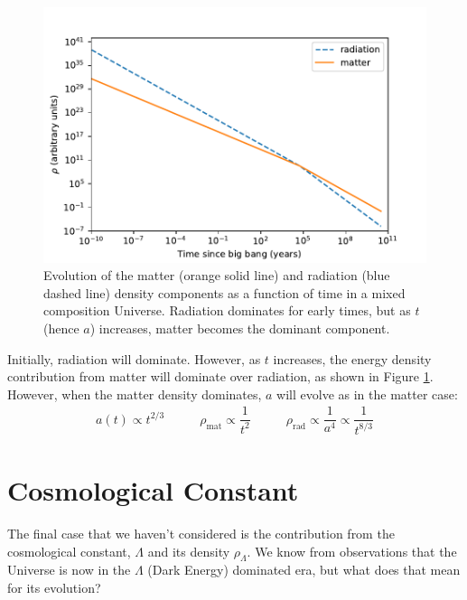 \documentclass[11pt,a4paper]{book}
\begin{document}
\begin{figure}
\includegraphics[width=1\linewidth]{Images/density_plot} \caption{Evolution of the matter (orange solid line) and radiation (blue dashed line) density components as a function of time in a mixed composition Universe. Radiation dominates for early times, but as $t$ (hence $a$) increases, matter becomes the dominant component.}\label{fig:density-fig}
\end{figure}

Initially, radiation will dominate. However, as \(t\) increases, the
energy density contribution from matter will dominate over radiation, as
shown in
Figure \ref{fig:density-fig}. However, when the matter density
dominates, \(a\) will evolve as in the matter case:
\begin{equation}
\begin{array}{lcr}
    a(t) \propto t^{2/3} & \qquad
    \rho_{\text{mat}} \propto \dfrac{1}{t^2} & \qquad
    \rho_{\text{rad}} \propto \dfrac{1}{a^4} \propto \dfrac{1}{t^{8/3}}
\end{array}
\label{eq:a-rho-comb}
\end{equation}

\hypertarget{sec:dark_energy_1}{%
\section{Cosmological Constant}\label{sec:dark_energy_1}}

The final case that we haven't considered is the contribution from the
cosmological constant, \(\Lambda\) and its density \(\rho_{\Lambda}\). We
know from observations that the Universe is now in the \(\Lambda\) (Dark
Energy) dominated era, but what does that mean for its evolution?
\end{document}
